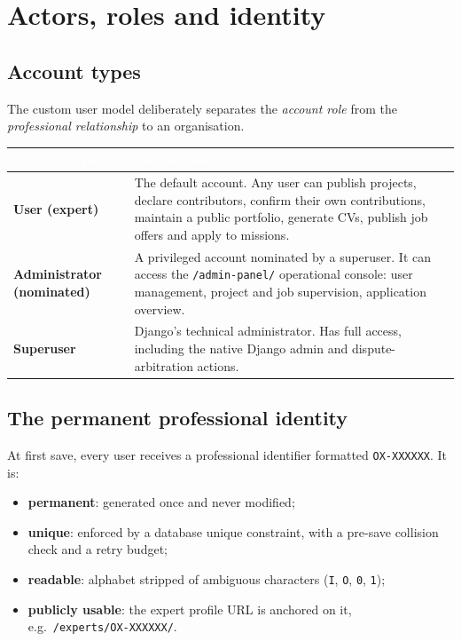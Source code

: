 \documentclass[11pt,a4paper]{article}
\renewcommand{\arraystretch}{1.25}
\newcommand{\theadcell}[1]{\textcolor{white}{\textbf{#1}}}
\newcommand{\tablehead}[1]{\rowcolor{mil900}#1}
\newcommand{\tablealt}{\rowcolor{mil50}}
\begin{document}
\section{Actors, roles and identity}
\label{sec:actors}

\subsection{Account types}

The custom user model deliberately separates the \emph{account role} from the
\emph{professional relationship} to an organisation.

\begin{center}
\renewcommand{\arraystretch}{1.35}
\begin{tabularx}{\textwidth}{@{}L{3.2cm}Y@{}}
  \toprule
  \tablehead{\theadcell{Account type} & \theadcell{Capabilities}} \\
  \midrule
  \textbf{User (expert)} &
  The default account. Any user can publish projects, declare contributors,
  confirm their own contributions, maintain a public portfolio, generate CVs,
  publish job offers and apply to missions. \\
  \tablealt
  \textbf{Administrator (nominated)} &
  A privileged account nominated by a superuser. It can access the
  \texttt{/admin-panel/} operational console: user management, project and job
  supervision, application overview. \\
  \textbf{Superuser} &
  Django's technical administrator. Has full access, including the native
  Django admin and dispute-arbitration actions. \\
  \bottomrule
\end{tabularx}
\end{center}

\subsection{The permanent professional identity}

At first save, every user receives a professional identifier formatted
\texttt{OX-XXXXXX}. It is:

\begin{itemize}[leftmargin=1.4em,itemsep=3pt]
  \item \textbf{permanent}: generated once and never modified;
  \item \textbf{unique}: enforced by a database unique constraint, with a
        pre-save collision check and a retry budget;
  \item \textbf{readable}: alphabet stripped of ambiguous characters
        (\texttt{I}, \texttt{O}, \texttt{0}, \texttt{1});
  \item \textbf{publicly usable}: the expert profile URL is anchored on it,
        e.g.\ \texttt{/experts/OX-XXXXXX/}.
\end{itemize}
\end{document}

